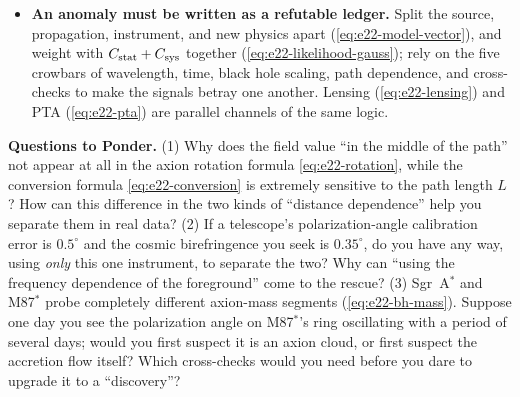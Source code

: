 \begin{itemize}
\item \textbf{An anomaly must be written as a refutable ledger.} Split the source, propagation, instrument, and new physics apart (\eqref{eq:e22-model-vector}), and weight with \(C_{\rm stat}+C_{\rm sys}\) together (\eqref{eq:e22-likelihood-gauss}); rely on the five crowbars of wavelength, time, black hole scaling, path dependence, and cross-checks to make the signals betray one another. Lensing (\eqref{eq:e22-lensing}) and PTA (\eqref{eq:e22-pta}) are parallel channels of the same logic.
\end{itemize}

\noindent\textbf{Questions to Ponder.}
(1) Why does the field value ``in the middle of the path'' not appear at all in the axion rotation formula \eqref{eq:e22-rotation}, while the conversion formula \eqref{eq:e22-conversion} is extremely sensitive to the path length \(L\)? How can this difference in the two kinds of ``distance dependence'' help you separate them in real data?
(2) If a telescope's polarization-angle calibration error is \(0.5^\circ\) and the cosmic birefringence you seek is \(0.35^\circ\), do you have any way, using \emph{only} this one instrument, to separate the two? Why can ``using the frequency dependence of the foreground'' come to the rescue?
(3) Sgr~A\(^*\) and M87\(^*\) probe completely different axion-mass segments (\eqref{eq:e22-bh-mass}). Suppose one day you see the polarization angle on M87\(^*\)'s ring oscillating with a period of several days; would you first suspect it is an axion cloud, or first suspect the accretion flow itself? Which cross-checks would you need before you dare to upgrade it to a ``discovery''?
